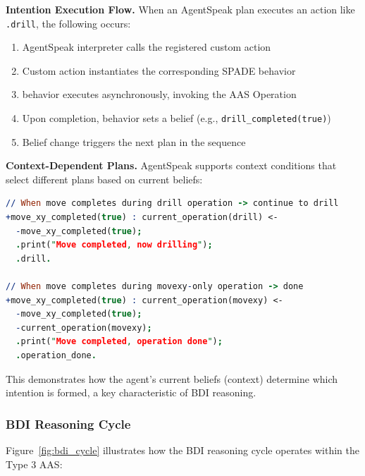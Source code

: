 \textbf{Intention Execution Flow.} When an AgentSpeak plan executes an action like \texttt{.drill}, the following occurs:
\begin{enumerate}
    \item AgentSpeak interpreter calls the registered custom action
    \item Custom action instantiates the corresponding SPADE behavior
    \item behavior executes asynchronously, invoking the \ac{AAS} Operation
    \item Upon completion, behavior sets a belief (e.g., \texttt{drill\_completed(true)})
    \item Belief change triggers the next plan in the sequence
\end{enumerate}

\textbf{Context-Dependent Plans.} AgentSpeak supports context conditions that select different plans based on current beliefs:

\begin{lstlisting}[language=Prolog, caption={Context-Dependent Intention Selection}, label={lst:context_plans}]
// When move completes during drill operation -> continue to drill
+move_xy_completed(true) : current_operation(drill) <-
  -move_xy_completed(true);
  .print("Move completed, now drilling");
  .drill.

// When move completes during movexy-only operation -> done
+move_xy_completed(true) : current_operation(movexy) <-
  -move_xy_completed(true);
  -current_operation(movexy);
  .print("Move completed, operation done");
  .operation_done.
\end{lstlisting}

This demonstrates how the agent's current beliefs (context) determine which intention is formed, a key characteristic of \ac{BDI} reasoning.
\subsubsection{BDI Reasoning Cycle}
Figure~\ref{fig:bdi_cycle} illustrates how the \ac{BDI} reasoning cycle operates within the Type 3 \ac{AAS}:


